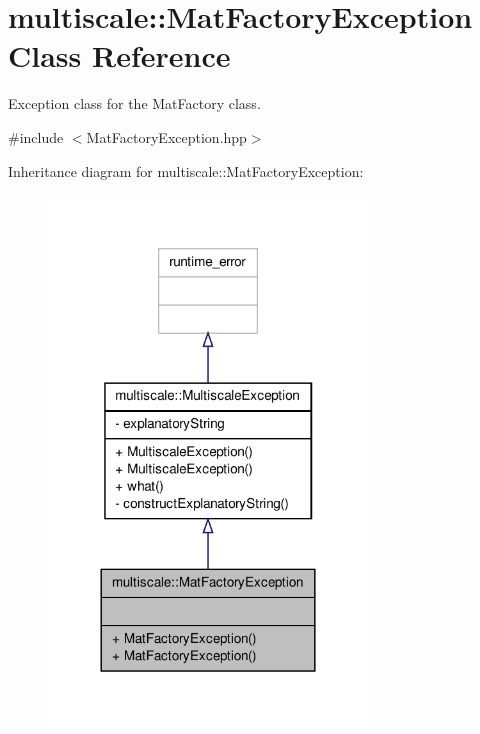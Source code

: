 \hypertarget{classmultiscale_1_1MatFactoryException}{\section{multiscale\-:\-:Mat\-Factory\-Exception Class Reference}
\label{classmultiscale_1_1MatFactoryException}
}


Exception class for the Mat\-Factory class.  




{\ttfamily \#include $<$Mat\-Factory\-Exception.\-hpp$>$}



Inheritance diagram for multiscale\-:\-:Mat\-Factory\-Exception\-:
\nopagebreak
\begin{figure}[H]
\begin{center}
\leavevmode
\includegraphics[width=240pt]{classmultiscale_1_1MatFactoryException__inherit__graph}
\end{center}
\end{figure}


